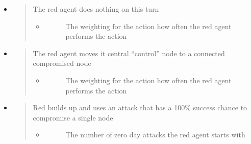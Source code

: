 \documentclass[letterpaper,10pt,english]{sphinxmanual}
\begin{document}
\begin{itemize}
\begin{description}
\begin{itemize}
\begin{quote}
\begin{itemize}
\begin{description}
\end{description}

\end{itemize}
\end{quote}

\item {}
\sphinxAtStartPar
{}
\begin{quote}

\sphinxAtStartPar
The red agent does nothing on this turn
\begin{itemize}
\item {} \begin{description}
\item[{}] \leavevmode
\sphinxAtStartPar
The weighting for the action \sphinxhyphen{} how often the red agent performs the action

\end{description}

\end{itemize}
\end{quote}

\item {}
\sphinxAtStartPar
{}
\begin{quote}

\sphinxAtStartPar
The red agent moves it central “control” node to a connected compromised node
\begin{itemize}
\item {} \begin{description}
\item[{}] \leavevmode
\sphinxAtStartPar
The weighting for the action \sphinxhyphen{} how often the red agent performs the action

\end{description}

\end{itemize}
\end{quote}

\item {}
\sphinxAtStartPar
{}
\begin{quote}

\sphinxAtStartPar
Red builds up and uses an attack that has a 100\% success chance to compromise a single node
\begin{itemize}
\item {} \begin{description}
\item[{}] \leavevmode
\sphinxAtStartPar
The number of zero day attacks the red agent starts with


\end{description}
\end{itemize}
\end{quote}
\end{itemize}
\end{description}
\end{itemize}
\end{document}
